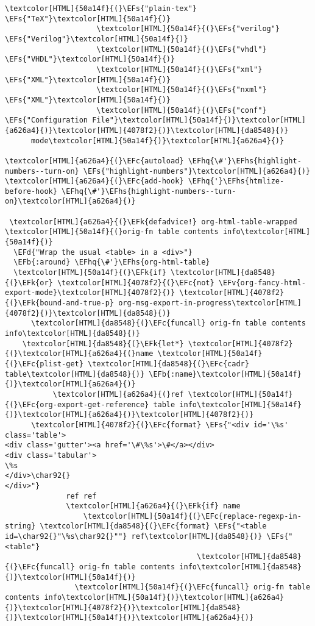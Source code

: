 \documentclass{scrartcl}
\newcommand{\EFk}[1]{\textcolor{EFk}{#1}} %
\newcommand{\EFd}[1]{\textcolor{EFd}{\textit{#1}}} %
\newcommand{\EFs}[1]{\textcolor{EFs}{#1}} %
\newcommand{\EFb}[1]{\textcolor{EFb}{#1}} %
\newcommand{\EFc}[1]{\textcolor{EFc}{#1}} %
\newcommand{\EFv}[1]{\textcolor{EFv}{#1}} %
\newcommand{\EFhq}[1]{\textcolor{EFhq}{#1}} %
\newcommand{\EFhs}[1]{\textcolor{EFhs}{#1}} %
\begin{document}
\begin{Code}
\begin{Verbatim}[]
                     \textcolor[HTML]{50a14f}{(}\EFs{"plain-tex"} \EFs{"TeX"}\textcolor[HTML]{50a14f}{)}
                     \textcolor[HTML]{50a14f}{(}\EFs{"verilog"} \EFs{"Verilog"}\textcolor[HTML]{50a14f}{)}
                     \textcolor[HTML]{50a14f}{(}\EFs{"vhdl"} \EFs{"VHDL"}\textcolor[HTML]{50a14f}{)}
                     \textcolor[HTML]{50a14f}{(}\EFs{"xml"} \EFs{"XML"}\textcolor[HTML]{50a14f}{)}
                     \textcolor[HTML]{50a14f}{(}\EFs{"nxml"} \EFs{"XML"}\textcolor[HTML]{50a14f}{)}
                     \textcolor[HTML]{50a14f}{(}\EFs{"conf"} \EFs{"Configuration File"}\textcolor[HTML]{50a14f}{)}\textcolor[HTML]{a626a4}{)}\textcolor[HTML]{4078f2}{)}\textcolor[HTML]{da8548}{)}
      mode\textcolor[HTML]{50a14f}{)}\textcolor[HTML]{a626a4}{)}

\textcolor[HTML]{a626a4}{(}\EFc{autoload} \EFhq{\#'}\EFhs{highlight-numbers--turn-on} \EFs{"highlight-numbers"}\textcolor[HTML]{a626a4}{)}
\textcolor[HTML]{a626a4}{(}\EFc{add-hook} \EFhq{'}\EFhs{htmlize-before-hook} \EFhq{\#'}\EFhs{highlight-numbers--turn-on}\textcolor[HTML]{a626a4}{)}

 \textcolor[HTML]{a626a4}{(}\EFk{defadvice!} org-html-table-wrapped \textcolor[HTML]{50a14f}{(}orig-fn table contents info\textcolor[HTML]{50a14f}{)}
  \EFd{"Wrap the usual <table> in a <div>"}
  \EFb{:around} \EFhq{\#'}\EFhs{org-html-table}
  \textcolor[HTML]{50a14f}{(}\EFk{if} \textcolor[HTML]{da8548}{(}\EFk{or} \textcolor[HTML]{4078f2}{(}\EFc{not} \EFv{org-fancy-html-export-mode}\textcolor[HTML]{4078f2}{)} \textcolor[HTML]{4078f2}{(}\EFk{bound-and-true-p} org-msg-export-in-progress\textcolor[HTML]{4078f2}{)}\textcolor[HTML]{da8548}{)}
      \textcolor[HTML]{da8548}{(}\EFc{funcall} orig-fn table contents info\textcolor[HTML]{da8548}{)}
    \textcolor[HTML]{da8548}{(}\EFk{let*} \textcolor[HTML]{4078f2}{(}\textcolor[HTML]{a626a4}{(}name \textcolor[HTML]{50a14f}{(}\EFc{plist-get} \textcolor[HTML]{da8548}{(}\EFc{cadr} table\textcolor[HTML]{da8548}{)} \EFb{:name}\textcolor[HTML]{50a14f}{)}\textcolor[HTML]{a626a4}{)}
           \textcolor[HTML]{a626a4}{(}ref \textcolor[HTML]{50a14f}{(}\EFc{org-export-get-reference} table info\textcolor[HTML]{50a14f}{)}\textcolor[HTML]{a626a4}{)}\textcolor[HTML]{4078f2}{)}
      \textcolor[HTML]{4078f2}{(}\EFc{format} \EFs{"<div id='\%s' class='table'>
<div class='gutter'><a href='\#\%s'>\#</a></div>
<div class='tabular'>
\%s
</div>\char92{}
</div>"}
              ref ref
              \textcolor[HTML]{a626a4}{(}\EFk{if} name
                  \textcolor[HTML]{50a14f}{(}\EFc{replace-regexp-in-string} \textcolor[HTML]{da8548}{(}\EFc{format} \EFs{"<table id=\char92{}"\%s\char92{}""} ref\textcolor[HTML]{da8548}{)} \EFs{"<table"}
                                            \textcolor[HTML]{da8548}{(}\EFc{funcall} orig-fn table contents info\textcolor[HTML]{da8548}{)}\textcolor[HTML]{50a14f}{)}
                \textcolor[HTML]{50a14f}{(}\EFc{funcall} orig-fn table contents info\textcolor[HTML]{50a14f}{)}\textcolor[HTML]{a626a4}{)}\textcolor[HTML]{4078f2}{)}\textcolor[HTML]{da8548}{)}\textcolor[HTML]{50a14f}{)}\textcolor[HTML]{a626a4}{)}



\end{Verbatim}
\end{Code}
\end{document}
